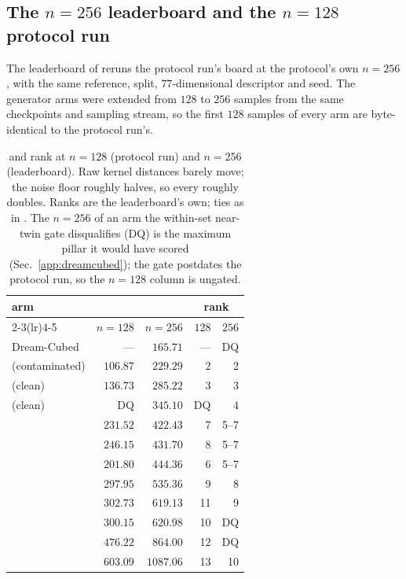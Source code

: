 \subsection{The $n{=}256$ leaderboard and the $n{=}128$ protocol run}
\label{app:n256}

The leaderboard of  reruns the protocol run's board at the
protocol's own $n{=}256$, with the same reference, split, $77$-dimensional
descriptor and seed. The generator arms were extended from $128$ to $256$
samples from the same checkpoints and sampling stream, so the first $128$
samples of every arm are byte-identical to the protocol run's.

\begin{table}[h]
\centering
\small
\setlength{\tabcolsep}{3pt}
\caption{\blockscore{} and rank at $n{=}128$ (protocol run) and $n{=}256$ (leaderboard).
Raw kernel distances barely move; the noise floor roughly halves, so every \blockscore{} roughly
doubles. Ranks are the leaderboard's own; ties as in . The
$n{=}256$ \blockscore{} of an arm the within-set near-twin gate disqualifies (DQ) is the
maximum pillar it would have scored (Sec.~\ref{app:dreamcubed}); the gate postdates the
protocol run, so the $n{=}128$ column is ungated.}
\label{tab:n256}
\begin{tabular}{lrrrr}
\toprule
arm & \multicolumn{2}{c}{\blockscore{}} & \multicolumn{2}{c}{rank} \\
\cmidrule(lr){2-3}\cmidrule(lr){4-5}
 & $n{=}128$ & $n{=}256$ & $128$ & $256$ \\
\midrule
Dream-Cubed              & ---      & $165.71$ & ---  & DQ \\
\voxar{} (contaminated)  & $106.87$ & $229.29$ & 2    & 2 \\
\voxar{} (clean)         & $136.73$ & $285.22$ & 3    & 3 \\
\voxarun{} (clean)       & DQ       & $345.10$ & DQ   & 4 \\
\matshuffle{}            & $231.52$ & $422.43$ & 7    & 5--7 \\
\patchstitch{}           & $246.15$ & $431.70$ & 8    & 5--7 \\
\solidify{}              & $201.80$ & $444.36$ & 6    & 5--7 \\
\monochrome{}            & $297.95$ & $535.36$ & 9    & 8 \\
\copynoise{}             & $302.73$ & $619.13$ & 11   & 9 \\
\gabled{}                & $300.15$ & $620.98$ & 10   & DQ \\
\hollowbox{}             & $476.22$ & $864.00$ & 12   & DQ \\
\randomvox{}             & $603.09$ & $1087.06$ & 13  & 10 \\
\bottomrule
\end{tabular}
\end{table}

